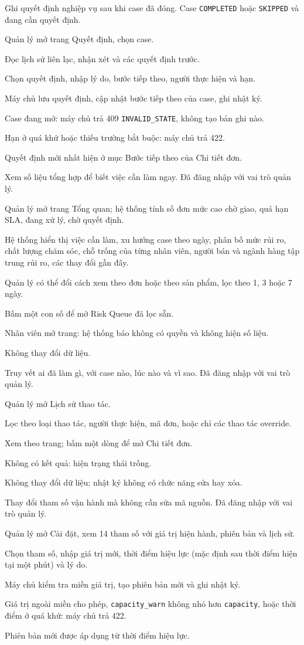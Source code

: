 {Ghi quyết định nghiệp vụ sau khi case đã đóng.}
{Case \texttt{COMPLETED} hoặc \texttt{SKIPPED} và đang cần quyết định.}
{\item Quản lý mở trang Quyết định, chọn case.
 \item Đọc lịch sử liên lạc, nhận xét và các quyết định trước.
 \item Chọn quyết định, nhập lý do, bước tiếp theo, người thực hiện và hạn.
 \item Máy chủ lưu quyết định, cập nhật bước tiếp theo của case, ghi nhật ký.}
{\item Case đang mở: máy chủ trả 409 \texttt{INVALID\_STATE}, không tạo bản ghi nào.
 \item Hạn ở quá khứ hoặc thiếu trường bắt buộc: máy chủ trả 422.}
{Quyết định mới nhất hiện ở mục Bước tiếp theo của Chi tiết đơn.}

{Xem số liệu tổng hợp để biết việc cần làm ngay.}
{Đã đăng nhập với vai trò quản lý.}
{\item Quản lý mở trang Tổng quan; hệ thống tính số đơn mức cao chờ giao, quá hạn SLA, đang xử lý, chờ quyết định.
 \item Hệ thống hiển thị việc cần làm, xu hướng case theo ngày, phân bố mức rủi ro, chất lượng chăm sóc, chỗ trống của từng nhân viên, người bán và ngành hàng tập trung rủi ro, các thay đổi gần đây.
 \item Quản lý có thể đổi cách xem theo đơn hoặc theo sản phẩm, lọc theo 1, 3 hoặc 7 ngày.
 \item Bấm một con số để mở Risk Queue đã lọc sẵn.}
{\item Nhân viên mở trang: hệ thống báo không có quyền và không hiện số liệu.}
{Không thay đổi dữ liệu.}

{Truy vết ai đã làm gì, với case nào, lúc nào và vì sao.}
{Đã đăng nhập với vai trò quản lý.}
{\item Quản lý mở Lịch sử thao tác.
 \item Lọc theo loại thao tác, người thực hiện, mã đơn, hoặc chỉ các thao tác override.
 \item Xem theo trang; bấm một dòng để mở Chi tiết đơn.}
{\item Không có kết quả: hiện trạng thái trống.}
{Không thay đổi dữ liệu; nhật ký không có chức năng sửa hay xóa.}

{Thay đổi tham số vận hành mà không cần sửa mã nguồn.}
{Đã đăng nhập với vai trò quản lý.}
{\item Quản lý mở Cài đặt, xem 14 tham số với giá trị hiện hành, phiên bản và lịch sử.
 \item Chọn tham số, nhập giá trị mới, thời điểm hiệu lực (mặc định sau thời điểm hiện tại một phút) và lý do.
 \item Máy chủ kiểm tra miền giá trị, tạo phiên bản mới và ghi nhật ký.}
{\item Giá trị ngoài miền cho phép, \texttt{capacity\_warn} không nhỏ hơn \texttt{capacity}, hoặc thời điểm ở quá khứ: máy chủ trả 422.}
{Phiên bản mới được áp dụng từ thời điểm hiệu lực.}

